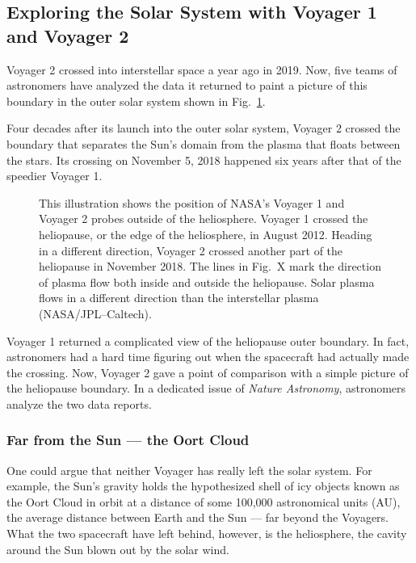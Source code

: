 \documentclass[a4paper,openany,12pt]{book}
\begin{document}
\subsection{Exploring the Solar System with Voyager 1 and Voyager 2}

Voyager 2 crossed into interstellar space a year ago in 2019. Now, five teams of astronomers have analyzed the data it returned to paint a picture of this boundary in the outer solar system shown in Fig.~\ref{V1}.

Four decades after its launch into the outer solar system, Voyager 2 crossed the boundary that separates the Sun's domain from the plasma that floats between the stars. Its crossing on November 5, 2018 happened six years after that of the speedier Voyager 1.
%
\begin{figure}[H]
\centerline{}
\caption{This illustration shows the position of NASA's Voyager 1 and Voyager 2 probes outside of the heliosphere. Voyager 1 crossed the heliopause, or the edge of the heliosphere, in August 2012. Heading in a different direction, Voyager 2 crossed another part of the heliopause in November 2018. The lines in Fig.~X mark the direction of plasma flow both inside and outside the heliopause. Solar plasma flows in a different direction than the interstellar plasma (NASA/JPL--Caltech).}
\label{V1}
\end{figure}
%

Voyager 1 returned a complicated view of the heliopause outer boundary. In fact, astronomers had a hard time figuring out when the spacecraft had actually made the crossing. Now, Voyager 2 gave a point of comparison with a simple picture of the heliopause boundary. In a dedicated issue of \emph{Nature Astronomy}, astronomers analyze the two data reports.

\subsubsection{Far from the Sun --- the Oort Cloud}

One could argue that neither Voyager has really left the solar system. For example, the Sun's gravity holds the hypothesized shell of icy objects known as the Oort Cloud in orbit at a distance of some 100,000 astronomical units (AU), the average distance between Earth and the Sun --- far beyond the Voyagers. What the two spacecraft have left behind, however, is the heliosphere, the cavity around the Sun blown out by the solar wind.
\end{document}
